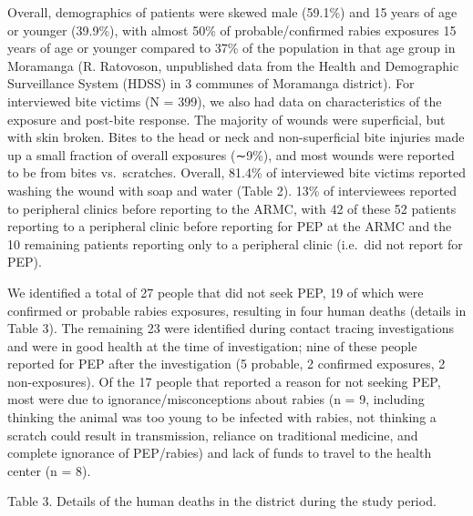 \documentclass[
]{book}
\begin{document}
Overall, demographics of patients were skewed male (59.1\%) and 15 years of age or younger (39.9\%), with almost 50\% of probable/confirmed rabies exposures 15 years of age or younger compared to 37\% of the population in that age group in Moramanga (R. Ratovoson, unpublished data from the Health and Demographic Surveillance System (HDSS) in 3 communes of Moramanga district). For interviewed bite victims (N = 399), we also had data on characteristics of the exposure and post-bite response. The majority of wounds were superficial, but with skin broken. Bites to the head or neck and non-superficial bite injuries made up a small fraction of overall exposures (∼9\%), and most wounds were reported to be from bites vs.~scratches. Overall, 81.4\% of interviewed bite victims reported washing the wound with soap and water (Table 2). 13\% of interviewees reported to peripheral clinics before reporting to the ARMC, with 42 of these 52 patients reporting to a peripheral clinic before reporting for PEP at the ARMC and the 10 remaining patients reporting only to a peripheral clinic (i.e.~did not report for PEP).

We identified a total of 27 people that did not seek PEP, 19 of which were confirmed or probable rabies exposures, resulting in four human deaths (details in Table 3). The remaining 23 were identified during contact tracing investigations and were in good health at the time of investigation; nine of these people reported for PEP after the investigation (5 probable, 2 confirmed exposures, 2 non-exposures). Of the 17 people that reported a reason for not seeking PEP, most were due to ignorance/misconceptions about rabies (n = 9, including thinking the animal was too young to be infected with rabies, not thinking a scratch could result in transmission, reliance on traditional medicine, and complete ignorance of PEP/rabies) and lack of funds to travel to the health center (n = 8).

Table 3. Details of the human deaths in the district during the study period.
\end{document}
